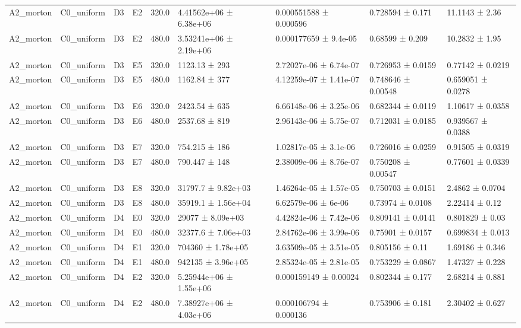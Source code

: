 \begin{table}
\begin{tabular}{lllllllll}
A2\_morton & C0\_uniform & D3 & E2 & 320.0 & 4.41562e+06 ± 6.38e+06 & 0.000551588 ± 0.000596 & 0.728594 ± 0.171 & 11.1143 ± 2.36 \\
A2\_morton & C0\_uniform & D3 & E2 & 480.0 & 3.53241e+06 ± 2.19e+06 & 0.000177659 ± 9.4e-05 & 0.68599 ± 0.209 & 10.2832 ± 1.95 \\
A2\_morton & C0\_uniform & D3 & E5 & 320.0 & 1123.13 ± 293 & 2.72027e-06 ± 6.74e-07 & 0.726953 ± 0.0159 & 0.77142 ± 0.0219 \\
A2\_morton & C0\_uniform & D3 & E5 & 480.0 & 1162.84 ± 377 & 4.12259e-07 ± 1.41e-07 & 0.748646 ± 0.00548 & 0.659051 ± 0.0278 \\
A2\_morton & C0\_uniform & D3 & E6 & 320.0 & 2423.54 ± 635 & 6.66148e-06 ± 3.25e-06 & 0.682344 ± 0.0119 & 1.10617 ± 0.0358 \\
A2\_morton & C0\_uniform & D3 & E6 & 480.0 & 2537.68 ± 819 & 2.96143e-06 ± 5.75e-07 & 0.712031 ± 0.0185 & 0.939567 ± 0.0388 \\
A2\_morton & C0\_uniform & D3 & E7 & 320.0 & 754.215 ± 186 & 1.02817e-05 ± 3.1e-06 & 0.726016 ± 0.0259 & 0.91505 ± 0.0319 \\
A2\_morton & C0\_uniform & D3 & E7 & 480.0 & 790.447 ± 148 & 2.38009e-06 ± 8.76e-07 & 0.750208 ± 0.00547 & 0.77601 ± 0.0339 \\
A2\_morton & C0\_uniform & D3 & E8 & 320.0 & 31797.7 ± 9.82e+03 & 1.46264e-05 ± 1.57e-05 & 0.750703 ± 0.0151 & 2.4862 ± 0.0704 \\
A2\_morton & C0\_uniform & D3 & E8 & 480.0 & 35919.1 ± 1.56e+04 & 6.62579e-06 ± 6e-06 & 0.73974 ± 0.0108 & 2.22414 ± 0.12 \\
A2\_morton & C0\_uniform & D4 & E0 & 320.0 & 29077 ± 8.09e+03 & 4.42824e-06 ± 7.42e-06 & 0.809141 ± 0.0141 & 0.801829 ± 0.03 \\
A2\_morton & C0\_uniform & D4 & E0 & 480.0 & 32377.6 ± 7.06e+03 & 2.84762e-06 ± 3.99e-06 & 0.75901 ± 0.0157 & 0.699834 ± 0.013 \\
A2\_morton & C0\_uniform & D4 & E1 & 320.0 & 704360 ± 1.78e+05 & 3.63509e-05 ± 3.51e-05 & 0.805156 ± 0.11 & 1.69186 ± 0.346 \\
A2\_morton & C0\_uniform & D4 & E1 & 480.0 & 942135 ± 3.96e+05 & 2.85324e-05 ± 2.81e-05 & 0.753229 ± 0.0867 & 1.47327 ± 0.228 \\
A2\_morton & C0\_uniform & D4 & E2 & 320.0 & 5.25944e+06 ± 1.55e+06 & 0.000159149 ± 0.00024 & 0.802344 ± 0.177 & 2.68214 ± 0.881 \\
A2\_morton & C0\_uniform & D4 & E2 & 480.0 & 7.38927e+06 ± 4.03e+06 & 0.000106794 ± 0.000136 & 0.753906 ± 0.181 & 2.30402 ± 0.627 \\

\end{tabular}
\end{table}
